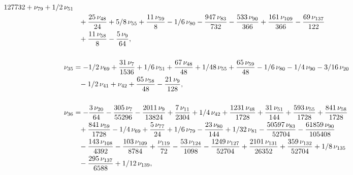 \documentclass[a4paper,12pt, DIV=14, BCOR=5mm, twoside, headsepline]{scrbook}
\begin{document}
\begin{align}
\begin{aligned}
{{{{127}}}{732}}+\nu_{{79}}+1/2\,\nu_{{51}}\\
 &\hphantom{=}+{\frac {25\,\nu_{{48}}}{24}}+
5/8\,\nu_{{55}}+{\frac {11\,\nu_{{59}}}{8}}-1/6\,\nu_{{80}}-{\frac {
947\,\nu_{{83}}}{732}}-{\frac {533\,\nu_{{90}}}{366}}+{\frac {161\,\nu
_{{109}}}{366}}-{\frac {69\,\nu_{{137}}}{122}}\\
 &\hphantom{=}+{\frac {11\,\nu_{{58}}
}{8}}-{\frac {5\,\nu_{{9}}}{64}}, \\
\\
\nu_{{35}}&=-1/2\,\nu_{{69}}+{\frac {
31\,\nu_{{7}}}{1536}}+1/6\,\nu_{{51}}+{\frac {67\,\nu_{{48}}}{48}}+1/
48\,\nu_{{55}}+{\frac {65\,\nu_{{59}}}{48}}-1/6\,\nu_{{80}}-1/4\,\nu_{
{90}}-3/16\,\nu_{{20}}\\
 &\hphantom{=}-1/2\,\nu_{{41}}+\nu_{{42}}+{\frac {65\,\nu_{{58
}}}{48}}-{\frac {21\,\nu_{{9}}}{128}}, \\
\\
\nu_{{36}}&=-{\frac {3\,\nu_{{20}
}}{64}}-{\frac {305\,\nu_{{7}}}{55296}}-{\frac {2011\,\nu_{{9}}}{13824
}}+{\frac {7\,\nu_{{11}}}{2304}}+1/4\,\nu_{{42}}+{\frac {1231\,\nu_{{
48}}}{1728}}+{\frac {31\,\nu_{{51}}}{144}}+{\frac {593\,\nu_{{55}}}{
1728}}+{\frac {841\,\nu_{{58}}}{1728}}\\
 &\hphantom{=}+{\frac {841\,\nu_{{59}}}{1728}}
-1/4\,\nu_{{69}}+{\frac {5\,\nu_{{77}}}{24}}+1/6\,\nu_{{79}}-{\frac {
23\,\nu_{{80}}}{144}}+1/32\,\nu_{{81}}-{\frac {50597\,\nu_{{83}}}{
52704}}-{\frac {61859\,\nu_{{90}}}{105408}}\\
 &\hphantom{=}-{\frac {143\,\nu_{{108}}}{
4392}}-{\frac {103\,\nu_{{109}}}{8784}}+{\frac {\nu_{{119}}}{72}}-{
\frac {53\,\nu_{{124}}}{1098}}-{\frac {1249\,\nu_{{127}}}{52704}}+{
\frac {2101\,\nu_{{131}}}{26352}}+{\frac {359\,\nu_{{132}}}{52704}}+1/
8\,\nu_{{135}}\\
 &\hphantom{=}-{\frac {295\,\nu_{{137}}}{6588}}+1/12\,\nu_{{139}},
\end{aligned}
\end{align}
\end{document}
